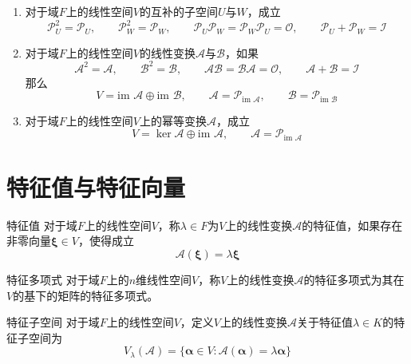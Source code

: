 \documentclass[lang = cn, scheme = chinese, thmcnt = section]{elegantbook}
\newcommand{\im}{\text{im }}           %
\newcommand{\bs}{\boldsymbol}          %
\begin{document}
\begin{theorem}
	\begin{enumerate}
		\item 对于域$F$上的线性空间$V$的互补的子空间$U$与$W$，成立%
		$$
		\mathscr{P}_U^2=\mathscr{P}_U,\qquad
		\mathscr{P}_W^2=\mathscr{P}_W,\qquad
		\mathscr{P}_U\mathscr{P}_W=\mathscr{P}_W\mathscr{P}_U=\mathscr{O},\qquad 
		\mathscr{P}_U+\mathscr{P}_W=\mathscr{I}
		$$
		\item 对于域$F$上的线性空间$V$的线性变换$\mathscr{A}$与$\mathscr{B}$，如果
		$$
		\mathscr{A}^2=\mathscr{A},\qquad
		\mathscr{B}^2=\mathscr{B},\qquad
		\mathscr{A}\mathscr{B}=\mathscr{B}\mathscr{A}=\mathscr{O},\qquad 
		\mathscr{A}+\mathscr{B}=\mathscr{I}
		$$
		那么%
		$$
		V=\im \mathscr{A}\oplus \im\mathscr{B},\qquad 
		\mathscr{A}=\mathscr{P}_{\im \mathscr{A}},\qquad
		\mathscr{B}=\mathscr{P}_{\im \mathscr{B}} 
		$$
		\item 对于域$F$上的线性空间$V$上的幂等变换$\mathscr{A}$，成立%
		$$
		V=\ker\mathscr{A}\oplus\im\mathscr{A},\qquad 
		\mathscr{A}=\mathscr{P}_{\im\mathscr{A}}
		$$
	\end{enumerate}
\end{theorem}

\section{特征值与特征向量}

\begin{definition}{特征值}
	对于域$F$上的线性空间$V$，称$\lambda\in F$为$V$上的线性变换$\mathscr{A}$的特征值，如果存在非零向量$\bs{\xi}\in V$，使得成立
	$$
	\mathscr{A}(\bs{\xi})=\lambda\bs{\xi}
	$$
\end{definition}

\begin{definition}{特征多项式}
	对于域$F$上的$n$维线性空间$V$，称$V$上的线性变换$\mathscr{A}$的特征多项式为其在$V$的基下的矩阵的特征多项式。
\end{definition}

\begin{definition}{特征子空间}
	对于域$F$上的线性空间$V$，定义$V$上的线性变换$\mathscr{A}$关于特征值$\lambda\in K$的特征子空间为
	$$
	V_\lambda(\mathscr{A})=\{ \bs{\alpha}\in V:\mathscr{A}(\bs{\alpha})=\lambda\bs{\alpha} \}
	$$
\end{definition}
\end{document}
